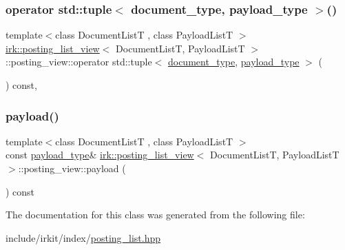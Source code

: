 \subsubsection{\texorpdfstring{operator std\+::tuple$<$ document\+\_\+type, payload\+\_\+type $>$()}{operator std::tuple< document\_type, payload\_type >()}}
{\footnotesize\ttfamily template$<$class Document\+ListT , class Payload\+ListT $>$ \\
\mbox{\hyperlink{classirk_1_1posting__list__view}{irk\+::posting\+\_\+list\+\_\+view}}$<$ Document\+ListT, Payload\+ListT $>$\+::posting\+\_\+view\+::operator std\+::tuple$<$ \mbox{\hyperlink{classirk_1_1posting__list__view_ac4615e6e3d8ee1eb9a847b7a34919977}{document\+\_\+type}}, \mbox{\hyperlink{classirk_1_1posting__list__view_a1c394061061a8eeeab98cb228f6cdde9}{payload\+\_\+type}} $>$ (\begin{DoxyParamCaption}{ }\end{DoxyParamCaption}) const\hspace{0.3cm}{\ttfamily [inline]}, {\ttfamily [explicit]}}

\mbox{\label{classirk_1_1posting__list__view_1_1posting__view_af30c88656e9aff285bcb6d2669934401}} 
\subsubsection{\texorpdfstring{payload()}{payload()}}
{\footnotesize\ttfamily template$<$class Document\+ListT , class Payload\+ListT $>$ \\
const \mbox{\hyperlink{classirk_1_1posting__list__view_a1c394061061a8eeeab98cb228f6cdde9}{payload\+\_\+type}}\& \mbox{\hyperlink{classirk_1_1posting__list__view}{irk\+::posting\+\_\+list\+\_\+view}}$<$ Document\+ListT, Payload\+ListT $>$\+::posting\+\_\+view\+::payload (\begin{DoxyParamCaption}{ }\end{DoxyParamCaption}) const\hspace{0.3cm}{\ttfamily [inline]}}



The documentation for this class was generated from the following file\+:\begin{DoxyCompactItemize}
\item 
include/irkit/index/\mbox{\hyperlink{posting__list_8hpp}{posting\+\_\+list.\+hpp}}\end{DoxyCompactItemize}
